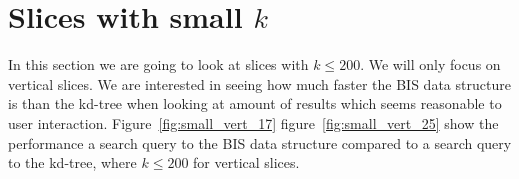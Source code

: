 \section{Slices with small $k$}
\label{sect:smallk}


In this section we are going to look at slices with $k\leq 200$. We will only focus on vertical slices. We are interested in seeing how much faster the BIS data structure is than the kd-tree when looking at amount of results which seems reasonable to user interaction. Figure~\ref{fig:small_vert_17} figure~\ref{fig:small_vert_25} show the performance a search query to the BIS data structure compared to a search query to the kd-tree, where $k \leq 200$ for vertical slices.

\begin{figure}[h]
\end{figure}
